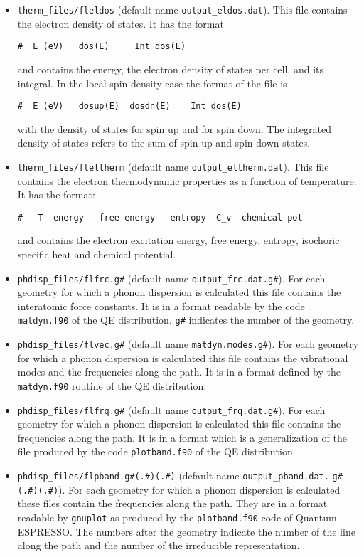 \documentclass[12pt,a4paper,twoside]{report}
\def\qe{{\sc Quantum ESPRESSO}}
\begin{document}
\begin{itemize}
\item 
\texttt{therm\_files/fleldos} (default name \texttt{output\_eldos.dat}).
This file contains the electron density of states. It has the format
\begin{verbatim}
#  E (eV)   dos(E)     Int dos(E)
\end{verbatim}
and contains the energy, the electron density of states per cell, and
its integral. In the local spin density case the format of the file is
\begin{verbatim}
#  E (eV)   dosup(E)  dosdn(E)    Int dos(E)
\end{verbatim}
with the density of states for spin up and for spin down. The integrated
density of states refers to the sum of spin up and spin down states.

\item 
\texttt{therm\_files/fleltherm} (default name \texttt{output\_eltherm.dat}).
This file contains the electron thermodynamic properties as a function of
temperature. It has the format:
\begin{verbatim}
#   T  energy   free energy   entropy  C_v  chemical pot
\end{verbatim}
and contains the electron excitation energy, free energy, entropy, 
isochoric specific heat and chemical potential.

\item 
\texttt{phdisp\_files/flfrc.g\#} (default name \texttt{output\_frc.dat.g\#}).
For each geometry for which a phonon dispersion is calculated this file
contains the interatomic force constants. It is in a format readable by
the code \texttt{matdyn.f90} of the QE distribution. \texttt{g\#} indicates 
the number of the geometry.

\item 
\texttt{phdisp\_files/flvec.g\#} (default name 
\texttt{matdyn.modes.g\#}). For each geometry for which a phonon dispersion
is calculated this file contains the vibrational modes and the frequencies
along the path. It is in a format defined by the \texttt{matdyn.f90} routine 
of the QE distribution.

\item 
\texttt{phdisp\_files/flfrq.g\#} (default name \texttt{output\_frq.dat.g\#}).
For each geometry for which a phonon dispersion is calculated this file
contains the frequencies along the path. It is in a format which is a 
generalization of the file produced by the code \texttt{plotband.f90} of 
the QE distribution.

\item 
\texttt{phdisp\_files/flpband.g\#(.\#)(.\#)} 
(default name \texttt{output\_pband.dat.} \texttt{g\#(.\#)(.\#)}).
For each geometry for which a phonon dispersion is calculated these files
contain the frequencies along the path. They are in a format readable by
\texttt{gnuplot} as produced by the \texttt{plotband.f90} code of \qe.
The numbers after the geometry indicate the number of the line 
along the path and the number of the irreducible representation.


\end{itemize}
\end{document}
